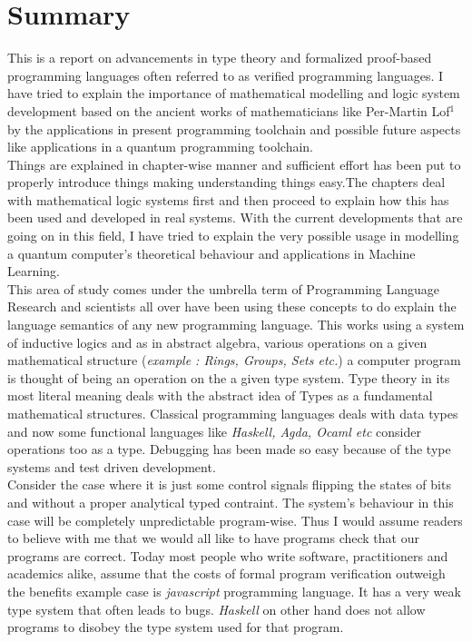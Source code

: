 \chapter*{Summary}

This is a report on advancements in type theory and formalized proof-based programming languages often referred to as verified programming languages. I have tried to explain the importance of mathematical modelling and logic system development based on the ancient works of mathematicians like Per-Martin Lof$^{1}$  by the applications in present programming toolchain and possible future aspects like applications in a quantum  programming toolchain.\\

Things are explained in chapter-wise manner and sufficient effort has been put to properly introduce things making understanding things easy.The chapters deal with mathematical logic systems first and then proceed to explain how this has been used and developed in real systems. With the current developments that are going on in this field, I have tried to explain the very possible usage in modelling a quantum computer's theoretical behaviour and applications in Machine Learning.\\

This area of study comes under the umbrella term of Programming Language Research and scientists all over have been  using these concepts to do explain the language semantics of any new programming language. This works using a system of inductive logics and as in abstract algebra, various operations on a given mathematical structure (\textit{example : Rings, Groups, Sets etc.}) a computer program is thought of being an operation on the a given type system. Type theory in its most literal meaning deals with the abstract idea of Types as a fundamental mathematical structures. Classical programming languages deals with data types and now some functional languages like \textit{Haskell, Agda, Ocaml etc} consider operations too as a type. Debugging has been made so easy because of the type systems and test driven development.\\

Consider the case where it is just some control signals flipping the states of bits and without a proper analytical typed contraint. The system's behaviour in this case will be completely unpredictable program-wise. Thus I would assume readers to believe with me that we would all like to have programs check that our programs are correct. Today most people who write software, practitioners and academics alike, assume that the costs of formal program verification outweigh the benefits example case is  \textit{javascript} programming language. It has a very weak type system that often leads to bugs.  \textit{Haskell} on other hand does not allow programs to disobey the type system used for that program.\\ 
